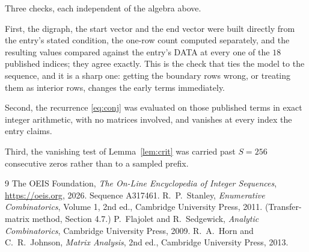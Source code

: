 \documentclass[11pt,a4paper]{article}
\theoremstyle{plain}
\theoremstyle{definition}
\begin{document}
Three checks, each independent of the algebra above.

First, the digraph, the start vector and the end vector were built directly from the
entry's stated condition, the one-row count computed separately, and the resulting values
compared against the entry's DATA at every one of the $18$ published indices; they
agree exactly. This is the check that ties the model to the sequence, and it is a sharp one:
getting the boundary rows wrong, or treating them as interior rows, changes the early terms
immediately.

Second, the recurrence \eqref{eq:conj} was evaluated on those published terms in exact
integer arithmetic, with no matrices involved, and vanishes at every index the entry claims.

Third, the vanishing test of Lemma~\ref{lem:crit} was carried past $S=256$ consecutive
zeros rather than to a sampled prefix.

\begin{thebibliography}{9}
 The OEIS Foundation, \emph{The On-Line Encyclopedia of Integer
Sequences}, \url{https://oeis.org}, 2026. Sequence A317461.
 R.~P.~Stanley, \emph{Enumerative Combinatorics}, Volume 1, 2nd ed.,
Cambridge University Press, 2011. (Transfer-matrix method, Section 4.7.)
 P.~Flajolet and R.~Sedgewick, \emph{Analytic Combinatorics}, Cambridge
University Press, 2009.
 R.~A.~Horn and C.~R.~Johnson, \emph{Matrix Analysis}, 2nd ed., Cambridge
University Press, 2013.
\end{thebibliography}
\end{document}
